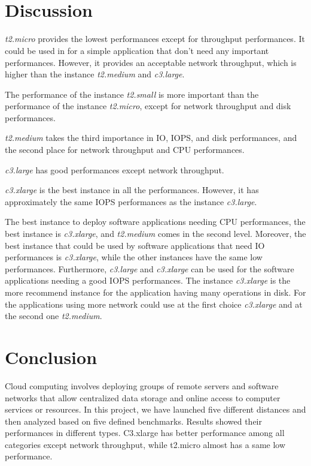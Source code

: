 \documentclass[10pt, conference]{IEEEtran}
\begin{document}
\

\
\nocite{*}

\section{Discussion}
\label{sec:discussion}

\textit{t2.micro} provides the lowest performances except for throughput performances. It could be used in for a simple application that don't need any important performances. However, it provides an acceptable network throughput, which is higher than the instance \textit{t2.medium} and \textit{c3.large}.

The performance of the instance \textit{t2.small} is more important than the performance of the instance \textit{t2.micro}, except for network throughput and disk performances. 

\textit{t2.medium} takes the third importance in IO, IOPS, and disk performances, and the second place for network throughput and CPU performances.

\textit{c3.large} has good performances except network throughput. 

\textit{c3.xlarge} is the best instance in all the performances. However, it has approximately the same IOPS performances as the instance \textit{c3.large}.

The best instance to deploy software applications needing CPU performances, the best instance is \textit{c3.xlarge}, and \textit{t2.medium} comes in the second level. Moreover, the best instance that could be used by software applications that need IO performances is \textit{c3.xlarge}, while the other instances have the same low performances. Furthermore, \textit{c3.large} and \textit{c3.xlarge} can be used for the software applications needing a good IOPS performances. The instance \textit{c3.xlarge} is the more recommend instance for the application having many operations in disk. For the applications using more network could use at the first choice \textit{c3.xlarge} and at the second one \textit{t2.medium}.


\section{Conclusion}
\label{sec:conclusion}
Cloud computing involves deploying groups of remote servers and software networks that allow centralized data storage and online access to computer services or resources. In this project, we have launched five different distances and then analyzed based on five defined benchmarks. Results showed their performances in different types. C3.xlarge has better performance among all categories except network throughput, while t2.micro almost has a same low performance.

\balance


\end{document}
